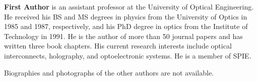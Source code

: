 \documentclass[12pt]{spieman}  %
\begin{document}
\begin{spacing}{2}



\vspace{2ex}\noindent\textbf{First Author} is an assistant professor at the University of Optical Engineering. He received his BS and MS degrees in physics from the University of Optics in 1985 and 1987, respectively, and his PhD degree in optics from the Institute of Technology in 1991.  He is the author of more than 50 journal papers and has written three book chapters. His current research interests include optical interconnects, holography, and optoelectronic systems. He is a member of SPIE.

\vspace{1ex}
\noindent Biographies and photographs of the other authors are not available.

\listoffigures
\listoftables

\end{spacing}
\end{document}
